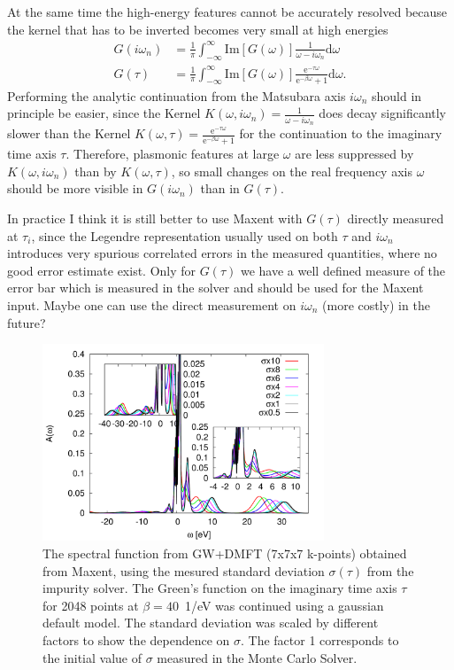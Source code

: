 \documentclass[12pt,a4paper]{scrartcl}
\numberwithin{equation}{section}
\begin{document}
At the same time the high-energy features cannot be accurately resolved because the
kernel that has to be inverted becomes very small at high energies
\begin{align}
G(i\omega_n) &= \frac{1}{\pi} \int_{-\infty}^{\infty} \mathrm{Im}[G(\omega)] 
                                \frac{1}{\omega-i\omega_n}\mathrm{d}\omega \\
G(\tau) &= \frac{1}{\pi} \int_{-\infty}^{\infty} \mathrm{Im}[G(\omega)]
                             \frac{\mathrm{e}^{-\tau\omega}}{\mathrm{e}^{-\beta\omega}+1}\mathrm{d}\omega.
\end{align}
Performing the analytic continuation from the Matsubara axis $i\omega_n$
should in principle be easier, since the Kernel $K(\omega,i\omega_n)= \frac{1}{\omega-i\omega_n}$
does decay significantly slower than the Kernel
$K(\omega,\tau)=\frac{\mathrm{e}^{-\tau\omega}}{\mathrm{e}^{-\beta\omega}+1}$
for the continuation to the imaginary time axis $\tau$.
Therefore, plasmonic features at large $\omega$ are less suppressed
by $K(\omega,i\omega_n)$ than by $K(\omega,\tau)$, so small changes on the real
frequency axis $\omega$ should be more visible in $G(i\omega_n)$ than in $G(\tau)$.

In practice I think it is still better to use Maxent with $G(\tau)$
directly measured at $\tau_i$, since the Legendre representation usually used
on both $\tau$ and $i\omega_n$ introduces very spurious correlated errors
in the measured quantities, where no good error estimate exist.
Only for $G(\tau)$ we have a well defined measure of the error bar 
which is measured in the solver and should be used for the Maxent input. 
Maybe one can use the direct measurement on $i\omega_n$ (more costly)
in the future?

\begin{figure}[t]
\begin{center}
\includegraphics[width=0.75\textwidth]{figs/GWDMFT_maxent_diffSigma.pdf} 
\end{center}
\caption{The spectral function from GW+DMFT (7x7x7 k-points) obtained from
Maxent, using the mesured standard deviation $\sigma(\tau)$
from the impurity solver. The Green's function
on the imaginary time axis $\tau$ for 2048 points at $\beta=40$\ 1/eV was continued
using a gaussian default model. The standard deviation was scaled by different
factors to show the dependence on $\sigma$. The factor 1 corresponds
to the initial value of $\sigma$ measured in the Monte Carlo Solver.}
\label{fig:gwdmft_anacont_diff_sigma}
\end{figure}
\end{document}
